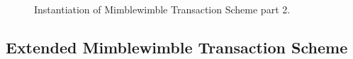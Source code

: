 \begin{figure}
    \begin{center}
    \end{center}
    \caption{Instantiation of Mimblewimble Transaction Scheme part 2. \label{fig:inst-mw-tx-2}}
\end{figure}

\subsection{Extended Mimblewimble Transaction Scheme}\label{subsec:atom:ext-tx-scheme}

